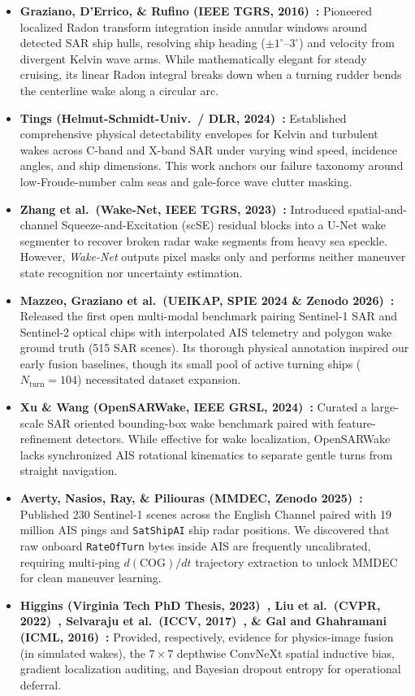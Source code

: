\documentclass[11pt,a4paper]{article}
\begin{document}
\begin{itemize}[leftmargin=1.5em]
    \item \textbf{Graziano, D'Errico, \& Rufino (IEEE TGRS, 2016)~\cite{graziano2016ship}:} Pioneered localized Radon transform integration inside annular windows around detected SAR ship hulls, resolving ship heading ($\pm 1^\circ$--$3^\circ$) and velocity from divergent Kelvin wave arms. While mathematically elegant for steady cruising, its linear Radon integral breaks down when a turning rudder bends the centerline wake along a circular arc.
    \item \textbf{Tings (Helmut-Schmidt-Univ.\ / DLR, 2024)~\cite{tings2024erkennung}:} Established comprehensive physical detectability envelopes for Kelvin and turbulent wakes across C-band and X-band SAR under varying wind speed, incidence angles, and ship dimensions. This work anchors our failure taxonomy around low-Froude-number calm seas and gale-force wave clutter masking.
    \item \textbf{Zhang et al.\ (Wake-Net, IEEE TGRS, 2023)~\cite{zhang2023wakenet}:} Introduced spatial-and-channel Squeeze-and-Excitation (scSE) residual blocks into a U-Net wake segmenter to recover broken radar wake segments from heavy sea speckle. However, \textit{Wake-Net} outputs pixel masks only and performs neither maneuver state recognition nor uncertainty estimation.
    \item \textbf{Mazzeo, Graziano et al.\ (UEIKAP, SPIE 2024 \& Zenodo 2026)~\cite{mazzeo2024spie_ueikap,mazzeo2026ueikap}:} Released the first open multi-modal benchmark pairing Sentinel-1 SAR and Sentinel-2 optical chips with interpolated AIS telemetry and polygon wake ground truth (515 SAR scenes). Its thorough physical annotation inspired our early fusion baselines, though its small pool of active turning ships ($N_{\text{turn}}=104$) necessitated dataset expansion.
    \item \textbf{Xu \& Wang (OpenSARWake, IEEE GRSL, 2024)~\cite{xu2024opensarwake}:} Curated a large-scale SAR oriented bounding-box wake benchmark paired with feature-refinement detectors. While effective for wake localization, OpenSARWake lacks synchronized AIS rotational kinematics to separate gentle turns from straight navigation.
    \item \textbf{Averty, Nasios, Ray, \& Piliouras (MMDEC, Zenodo 2025)~\cite{averty_mmdec}:} Published 230 Sentinel-1 scenes across the English Channel paired with 19 million AIS pings and \texttt{SatShipAI} ship radar positions. We discovered that raw onboard \texttt{RateOfTurn} bytes inside AIS are frequently uncalibrated, requiring multi-ping $d(\text{COG})/dt$ trajectory extraction to unlock MMDEC for clean maneuver learning.
    \item \textbf{Higgins (Virginia Tech PhD Thesis, 2023)~\cite{higgins2023machine}, Liu et al.\ (CVPR, 2022)~\cite{liu2022convnext}, Selvaraju et al.\ (ICCV, 2017)~\cite{selvaraj2017gradcam}, \& Gal and Ghahramani (ICML, 2016)~\cite{gal2016dropout}:} Provided, respectively, evidence for physics-image fusion (in simulated wakes), the $7\times 7$ depthwise ConvNeXt spatial inductive bias, gradient localization auditing, and Bayesian dropout entropy for operational deferral.
\end{itemize}
\end{document}
